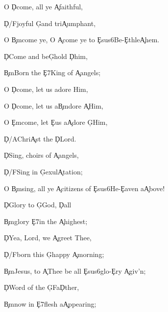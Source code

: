 \documentclass[9pt]{extarticle}
\begin{document}
\bsong

\bv
O \c{D}come, all ye \c{A}faithful,

\c{D/F\s }joyful \c{G}and tri\c{A}umphant,

O \c{Bm}come ye, O \c{A}come ye to \c{Esus6}Be-\c{E}thle\c{A}hem.

\c{D}Come and be\c{G}hold \c{D}him,

\c{Bm}Born the \c{E7}King of \c{A}angels;
\ev

\bc
O \c{D}come, let us adore Him,

O \c{D}come, let us a\c{Bm}dore \c{A}Him,

O \c{Em}come, let \c{E}us a\c{A}dore \c{G}Him,

\c{D/A}Chri\c{A}st the \c{D}Lord.
\ec

\bv
\c{D}Sing, choirs of \c{A}angels,

\c{D/F\s }Sing in \c{G}exul\c{A}tation;

O \c{Bm}sing, all ye \c{A}citizens of  \c{Esus6}He-\c{E}aven a\c{A}bove!

\c{D}Glory to \c{G}God, \c{D}all

\c{Bm}glory \c{E7}in the \c{A}highest;
\ev


\bv
\c{D}Yea, Lord, we \c{A}greet Thee,

\c{D/F\s }born this \c{G}happy \c{A}morning;

\c{Bm}Jesus, to \c{A}Thee be all \c{Esus6}glo-\c{E}ry \c{A}giv'n;

\c{D}Word of the \c{G}Fa\c{D}ther,

\c{Bm}now in \c{E7}flesh a\c{A}ppearing;
\ev


\esong
\end{document}
